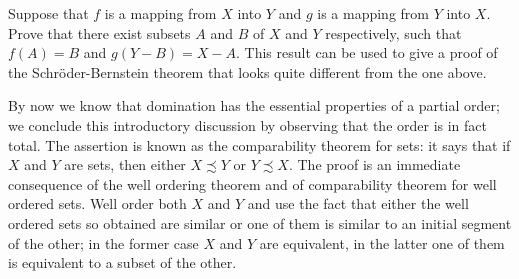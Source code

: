 \begin{exercise} Suppose that $f$ is a mapping from $X$ into $Y$ and $g$ is a mapping from $Y$ into $X$. Prove that there exist subsets $A$ and $B$ of $X$ and $Y$ respectively, such that $f(A) = B$ and $g(Y - B) = X - A$. This result can be used to give a proof of the Schröder-Bernstein theorem that looks quite different from the one above. 
\end{exercise}

By now we know that domination has the essential properties of a partial order; we conclude this introductory discussion by observing that the order is in fact total. The assertion is known as the comparability theorem for sets: it says that if $X$ and $Y$ are sets, then either $X \precsim Y$ or $Y \precsim X$. The proof is an immediate consequence of the well ordering theorem and of comparability theorem for well ordered sets. Well order both $X$ and $Y$ and use the fact that either the well ordered sets so obtained are similar or one of them is similar to an initial segment of the other; in the former case $X$ and $Y$ are equivalent, in the latter one of them is equivalent to a subset of the other.
